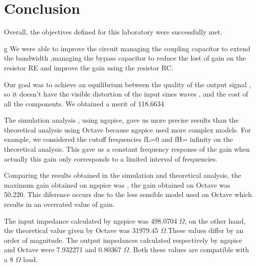 \section{Conclusion}
\label{sec:conclusion}


Overall, the objectives defined for this laboratory were successfully met.

g
We were able to improve the circuit managing the coupling capacitor to extend the bandwidth ,managing the bypass capacitor to reduce the lost of gain on the resistor RE and improve the gain using the resistor RC.



Our goal was to achieve an equilibrium between the quality of the output signal , so it doesn't have the visible distortion of the input sines waves , and the cost of all the components. We obtained a merit of 118.6634



The simulation analysis , using ngspice, gave us more precise results than the theoretical analysis using Octave because ngspice used more complex models. For example, we considered the cutoff frequencies fL=0 and fH= infinity on the theoretical analysis. This gave us a constant frequency response of the gain when actually this gain only corresponds to a limited interval of frequencies. 


Comparing the results obtained in the simulation and theoretical analysis, the maximum gain obtained on ngspice was , the gain obtained on Octave was 50.220. This diference occurs due to the less sensible model used on Octave which results  in an overrated value of gain. 


The input impedance calculated by ngspice was 498.0704 $\Omega$, on the other hand, the theoretical value  given by Octave was 31979.45 $\Omega$.These values differ by an order of magnitude. The output impedances calculated respectively by ngspice and Octave were 7.932271 and 0.80367 $\Omega$. Both these values are compatible with a 8 $\Omega$ load. 



